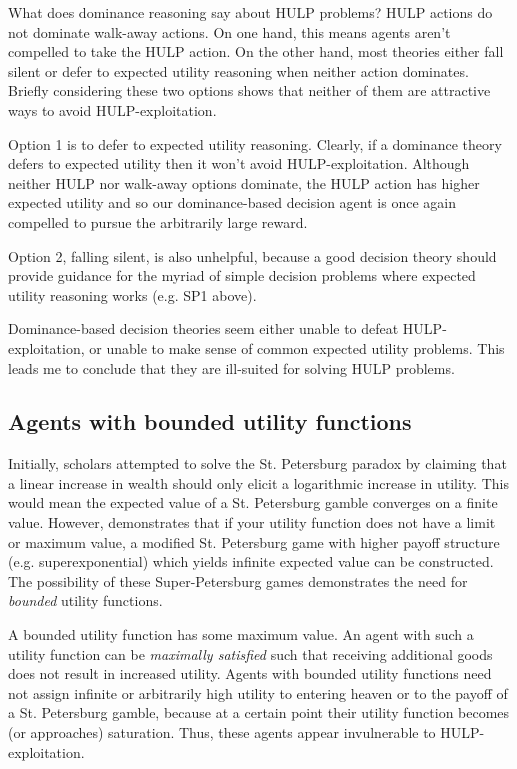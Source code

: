 \documentclass{article}
\begin{document}
What does dominance reasoning say about HULP problems? HULP actions do not dominate walk-away actions. On one hand, this means agents aren't compelled to take the HULP action. On the other hand, most theories either fall silent or defer to expected utility reasoning when neither action dominates. Briefly considering these two options shows that neither of them are attractive ways to avoid HULP-exploitation.

Option 1 is to defer to expected utility reasoning. Clearly, if a dominance theory defers to expected utility then it won't avoid HULP-exploitation. Although neither HULP nor walk-away options dominate, the HULP action has higher expected utility and so our dominance-based decision agent is once again compelled to pursue the arbitrarily large reward.

Option 2, falling silent, is also unhelpful, because a good decision theory should provide guidance for the myriad of simple decision problems where expected utility reasoning works (e.g. SP1 above).

Dominance-based decision theories seem either unable to defeat HULP-exploitation, or unable to make sense of common expected utility problems. This leads me to conclude that they are ill-suited for solving HULP problems.

\subsection{Agents with bounded utility functions}

Initially, scholars attempted to solve the St. Petersburg paradox by claiming that a linear increase in wealth should only elicit a logarithmic increase in utility. This would mean the expected value of a St. Petersburg gamble converges on a finite value. However, \citep{menger1934petersburg} demonstrates that if your utility function does not have a limit or maximum value, a modified St. Petersburg game with higher payoff structure (e.g. superexponential) which yields infinite expected value can be constructed. The possibility of these Super-Petersburg games demonstrates the need for \textit{bounded} utility functions.

A bounded utility function has some maximum value. An agent with such a utility function can be \textit{maximally satisfied} such that receiving additional goods does not result in increased utility. Agents with bounded utility functions need not assign infinite or arbitrarily high utility to entering heaven or to the payoff of a St. Petersburg gamble, because at a certain point their utility function becomes (or approaches) saturation. Thus, these agents appear invulnerable to HULP-exploitation. 
\end{document}
